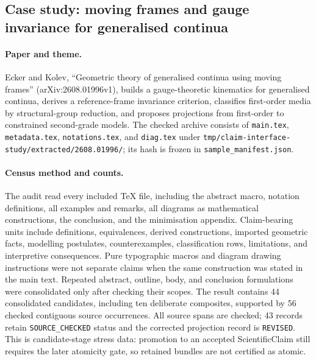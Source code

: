 \subsection{Case study: moving frames and gauge invariance for generalised continua}
\label{case:2608-01996}

\paragraph{Paper and theme.}
Ecker and Kolev, ``Geometric theory of generalised continua using moving frames'' (arXiv:2608.01996v1), builds a gauge-theoretic kinematics for generalised continua, derives a reference-frame invariance criterion, classifies first-order media by structural-group reduction, and proposes projections from first-order to constrained second-grade models. The checked archive consists of \texttt{main.tex}, \texttt{metadata.tex}, \texttt{notations.tex}, and \texttt{diag.tex} under \texttt{tmp/claim-interface-study/extracted/2608.01996/}; its hash is frozen in \texttt{sample\_manifest.json}.

\paragraph{Census method and counts.}
The audit read every included TeX file, including the abstract macro, notation definitions, all examples and remarks, all diagrams as mathematical constructions, the conclusion, and the minimisation appendix. Claim-bearing units include definitions, equivalences, derived constructions, imported geometric facts, modelling postulates, counterexamples, classification rows, limitations, and interpretive consequences. Pure typographic macros and diagram drawing instructions were not separate claims when the same construction was stated in the main text. Repeated abstract, outline, body, and conclusion formulations were consolidated only after checking their scopes. The result contains 44 consolidated candidates, including ten deliberate composites, supported by 56 checked contiguous source occurrences. All source spans are checked; 43 records retain \texttt{SOURCE\_CHECKED} status and the corrected projection record is \texttt{REVISED}. This is candidate-stage stress data: promotion to an accepted ScientificClaim still requires the later atomicity gate, so retained bundles are not certified as atomic.

